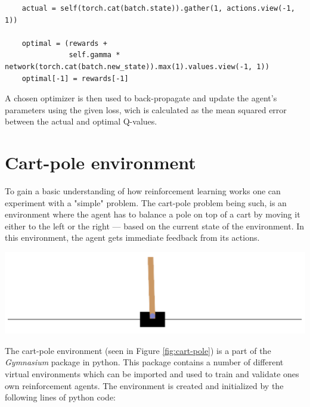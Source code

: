 \documentclass{article}
\let\oldcite\cite
\renewcommand{\cite}[1]{\textbf{\oldcite{#1}}}
\renewenvironment{leftbar}[1][\hsize]{
    \def\FrameCommand{{\color{barcolor}\vrule width 0.5pt \hspace{10pt}}}
    \MakeFramed{\hsize#1 \advance\hsize-\width \FrameRestore}
}{\endMakeFramed}
\begin{document}
\begin{leftbar}
    \begin{lstlisting}
    actual = self(torch.cat(batch.state)).gather(1, actions.view(-1, 1))

    optimal = (rewards +
               self.gamma * network(torch.cat(batch.new_state)).max(1).values.view(-1, 1))
    optimal[-1] = rewards[-1]
    \end{lstlisting}

    A chosen optimizer is then used to back-propagate and update the agent's parameters using the given loss, wich is calculated as the mean squared error between the actual and optimal Q-values. \cite{Q-deep}

\end{leftbar}

\section*{Cart-pole environment}

\begin{minipage}{.5\textwidth}
  To gain a basic understanding of how reinforcement learning works one can experiment with a "simple" problem. The cart-pole problem being such, is an environment where the agent has to balance a pole on top of a cart by moving it either to the left or the right — based on the current state of the environment. In this environment, the agent gets immediate feedback from its actions.
\end{minipage}%
\begin{minipage}{.5\textwidth}
    \centering
    \includegraphics[width=.8\linewidth]{images/cart-pole.png}
    \label{fig:cart-pole}
\end{minipage}

\vspace{0.2cm}

The cart-pole environment (seen in Figure \ref{fig:cart-pole}) is a part of the \textit{Gymnasium} package in python. This package contains a number of different virtual environments which can be imported and used to train and validate ones own reinforcement agents. \cite{Gymnasium} \cite{Cart-pole} The environment is created and initialized by the following lines of python code:
\end{document}
